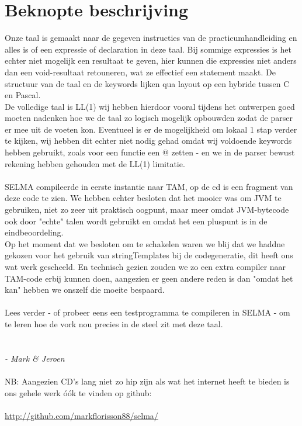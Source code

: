 \documentclass[]{article}
\begin{document}
\section{Beknopte beschrijving}
Onze taal is gemaakt naar de gegeven instructies van de practicumhandleiding en alles is of een expressie of declaration in deze taal. Bij sommige expressies is het echter niet mogelijk een resultaat te geven, hier kunnen die expressies niet anders dan een void-resultaat retouneren, wat ze effectief een statement maakt. De structuur van de taal en de keywords lijken qua layout op een hybride tussen C en Pascal. \\
De volledige taal is LL(1) wij hebben hierdoor vooral tijdens het ontwerpen goed moeten nadenken hoe we de taal zo logisch mogelijk opbouwden zodat de parser er mee uit de voeten kon. Eventueel is er de mogelijkheid om lokaal 1 stap verder te kijken, wij hebben dit echter niet nodig gehad omdat wij voldoende keywords hebben gebruikt, zoals voor een functie een @ zetten - en we in de parser bewust rekening hebben gehouden met de LL(1) limitatie.\\
\\
SELMA compileerde in eerste instantie naar TAM, op de cd is een fragment van deze code te zien. We hebben echter besloten dat het mooier was om JVM te gebruiken, niet zo zeer uit praktisch oogpunt, maar meer omdat JVM-bytecode ook door "echte" talen wordt gebruikt en omdat het een pluspunt is in de eindbeoordeling.\\
Op het moment dat we besloten om te schakelen waren we blij dat we haddne gekozen voor het gebruik van stringTemplates bij de codegeneratie, dit heeft ons wat werk gescheeld. En technisch gezien zouden we zo een extra compiler naar TAM-code erbij kunnen doen, aangezien er geen andere reden is dan "omdat het kan" hebben we onszelf die moeite bespaard.\\
\\
Lees verder - of probeer eens een testprogramma te compileren in SELMA - om te leren hoe de vork nou precies in de steel zit met deze taal.\\
\\
\\
\textit{- Mark \& Jeroen}\\
\\
NB: Aangezien CD's lang niet zo hip zijn als wat het internet heeft te bieden is ons gehele werk \'{o}\'{o}k te vinden op github: \\
\\
\url{http://github.com/markflorisson88/selma/}
\end{document}
